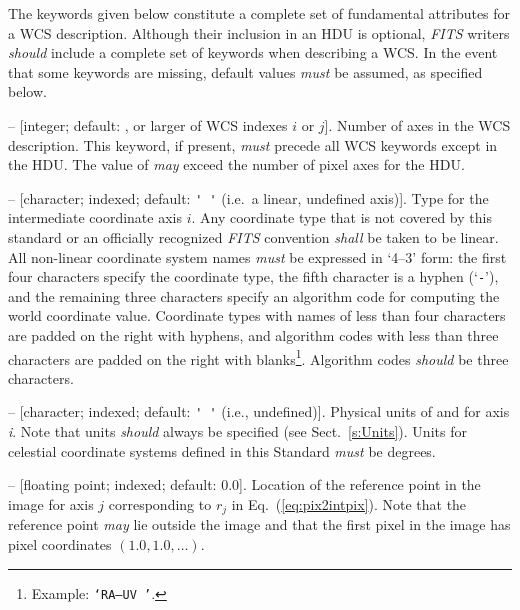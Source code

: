 \documentclass[onecolumn]{aa}
\begin{document}
The keywords given below constitute a complete set of fundamental attributes for a
WCS description. Although their inclusion in an HDU is optional, {\em FITS\/} writers
{\em should} include a complete set of keywords when describing a WCS. In the
event that some keywords are missing, default values {\em must} be assumed, as
specified below. 

\begin{description}

\item {} -- [integer; default: , or 
larger of WCS indexes $i$ or $j$]. 
Number of axes in the WCS description. This keyword, if present,
{\em must} precede all WCS keywords except  in the HDU. The value of
 {\em may} exceed the number of pixel axes for the HDU. 

\item {} -- [character; indexed; default: {\verb*+' '+} (i.e.\ a
linear, undefined axis)]. 
Type for the intermediate coordinate axis $i$. Any
coordinate type that is not covered by this standard or an officially recognized
{\em FITS\/} convention {\em shall} be taken to be linear. All non-linear coordinate
system names {\em must} be expressed in `4--3' form: the first four characters
specify the coordinate type, the fifth character is a hyphen (`{\tt -}'), and the
remaining three characters specify an algorithm code for computing the world
coordinate value. Coordinate types with names of less than four characters are
padded on the right with hyphens, and algorithm codes with less than three
characters are padded on the right with blanks\footnote{Example: 
\texttt{`RA---UV~'}.}. 
Algorithm codes {\em should} be three characters. 

\item {} -- [character; indexed; default: {\verb*+' '+} (i.e.,
undefined)]. 
Physical units of  and  for axis {\it i}. Note
that units {\em should} always be specified (see Sect.\ \ref{s:Units}). Units for celestial
coordinate systems defined in this Standard {\em must} be degrees. 

\item {} -- [floating point; indexed; default: 0.0]. 
Location of the reference point in the image for axis $j$
corresponding to $r_j$ in Eq.~(\ref{eq:pix2intpix}).  Note that the
reference point {\em may} lie outside the image and that the first pixel
in the image has pixel coordinates $(1.0, 1.0, \ldots)$. 


\end{description}
\end{document}
